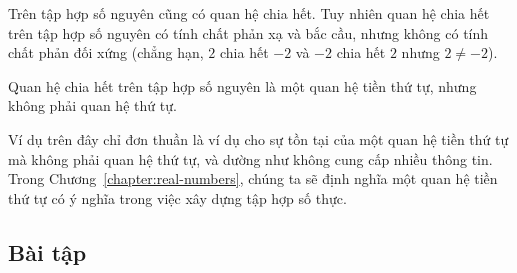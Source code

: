 \begin{example}
    Trên tập hợp số nguyên cũng có quan hệ chia hết. Tuy nhiên quan hệ chia hết trên tập hợp số nguyên có tính chất phản xạ và bắc cầu, nhưng không có tính chất phản đối xứng (chẳng hạn, $2$ chia hết $-2$ và $-2$ chia hết $2$ nhưng $2\ne -2$).

    \noindent Quan hệ chia hết trên tập hợp số nguyên là một quan hệ tiền thứ tự, nhưng không phải quan hệ thứ tự.
\end{example}

Ví dụ trên đây chỉ đơn thuần là ví dụ cho sự tồn tại của một quan hệ tiền thứ tự mà không phải quan hệ thứ tự, và dường như không cung cấp nhiều thông tin. Trong Chương~\ref{chapter:real-numbers}, chúng ta sẽ định nghĩa một quan hệ tiền thứ tự có ý nghĩa trong việc xây dựng tập hợp số thực.

\subsection{Bài tập}

